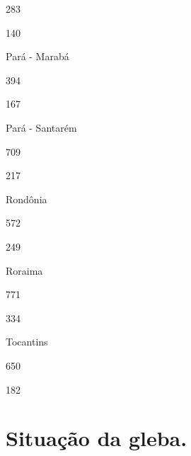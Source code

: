 \documentclass[
  letterpaper,
]{report}
\begin{document}
\n      

283

\n      

140

\n    

\n    

\n      

Pará - Marabá

\n      

394

\n      

167

\n    

\n    

\n      

Pará - Santarém

\n      

709

\n      

217

\n    

\n    

\n      

Rondônia

\n      

572

\n      

249

\n    

\n    

\n      

Roraima

\n      

771

\n      

334

\n    

\n    

\n      

Tocantins

\n      

650

\n      

182

\n    

\n  

\n


\hypertarget{situauxe7uxe3o-da-gleba.}{%
\chapter{Situação da gleba.}\label{situauxe7uxe3o-da-gleba.}}
\end{document}
